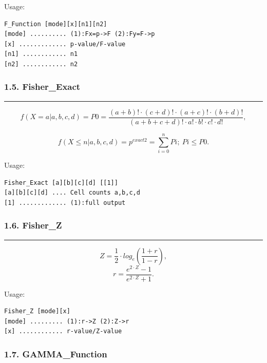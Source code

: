 \documentclass[
]{article}
\begin{document}
Usage:

\begin{verbatim}
F_Function [mode][x][n1][n2]
[mode] .......... (1):Fx=p->F (2):Fy=F->p
[x] ............. p-value/F-value
[n1] ............ n1
[n2] ............ n2
\end{verbatim}

\hypertarget{fisher_exact}{%
\subsubsection{1.5. Fisher\_Exact}\label{fisher_exact}}

\begin{center}\rule{0.5\linewidth}{0.5pt}\end{center}

\[f\left( X = a|a,b,c,d \right) = P0 = \frac{(a + b)! \cdot (c + d)! \cdot (a + c)! \cdot (b + d)!}{(a + b + c + d)! \cdot a! \cdot b! \cdot c! \cdot d!},\]

\[f\left( X \leq n|a,b,c,d \right) = p^{exact2} = \sum_{i = 0}^{n}Pi;\ Pi \leq P0.\]

Usage:

\begin{verbatim}
Fisher_Exact [a][b][c][d] [[1]]
[a][b][c][d] .... Cell counts a,b,c,d
[1] ............. (1):full output
\end{verbatim}

\hypertarget{fisher_z}{%
\subsubsection{1.6. Fisher\_Z}\label{fisher_z}}

\begin{center}\rule{0.5\linewidth}{0.5pt}\end{center}

\[Z = \frac{1}{2} \cdot log_{e}\left( \frac{1 + r}{1 - r} \right),\]
\[r = \frac{e^{2 \cdot Z} - 1}{e^{2 \cdot Z} + 1}.\]

Usage:

\begin{verbatim}
Fisher_Z [mode][x]
[mode] ......... (1):r->Z (2):Z->r
[x] ............ r-value/Z-value
\end{verbatim}

\hypertarget{gamma_function}{%
\subsubsection{1.7. GAMMA\_Function}\label{gamma_function}}
\end{document}
